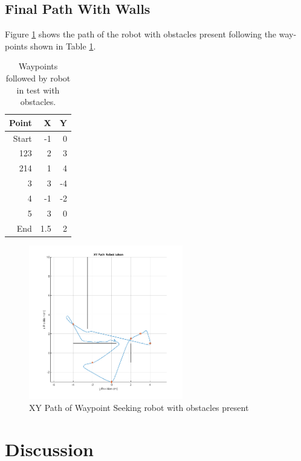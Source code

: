 \documentclass[11pt]{article}
\numberwithin{equation}{section}
\begin{document}
\subsection{Final Path With Walls}
\label{sec:org48932fc}
Figure \ref{figWaypointsFollowingWithObstacles} shows the path of the robot with obstacles present following the way-points shown in Table \ref{tabWaypointsFollowedWithObstacles}.

\begin{table}[H]
\caption{\label{tabWaypointsFollowedWithObstacles}Waypoints followed by robot in test with obstacles.}
\centering
\begin{tabular}{rrr}
\toprule
Point & X & Y\\
\midrule
Start & -1 & 0\\
123 & 2 & 3\\
214 & 1 & 4\\
3 & 3 & -4\\
4 & -1 & -2\\
5 & 3 & 0\\
End & 1.5 & 2\\
\bottomrule
\end{tabular}
\end{table}

\begin{figure}[H]
\centering
\includegraphics[width=0.6\textwidth]{Section3/Figures/FinalFigures/xVyCustom_HomingWP_Task2task2Walls.png}
\caption{\label{figWaypointsFollowingWithObstacles}XY Path of Waypoint Seeking robot with obstacles present}
\end{figure}

\section{Discussion}
\label{sec:org0c4017b}
\end{document}
